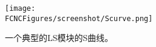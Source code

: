 \begin{figure}[H]
\centering
\texttt{[image: \\FCNCFigures/screenshot/Scurve.png]}
\caption{一个典型的LS模块的S曲线。}
\label{fig:Scurve}
\end{figure}